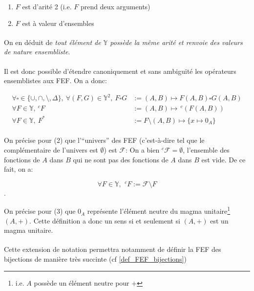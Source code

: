 \documentclass{article}
\newcommand{\Y}{{\mathbb Y}}
\newcommand{\cF}{{\mathcal F}}
\begin{document}
\begin{enumerate}
	\item $F$ est d'arité 2 (i.e. $F$ prend deux arguments)
	\item $F$ est à valeur d'ensembles
\end{enumerate}

\paragraph{}
On en déduit de \emph{tout élément de $\Y$ possède la même arité et renvoie des valeurs de nature ensembliste}.

\paragraph{}
Il est donc possible d'étendre canoniquement et sans ambiguïté les opérateurs ensemblistes aux FEF.
On a donc:

\begin{align}
	\forall \square \in \{\cup, \cap, \setminus, \Delta \},\ \forall (F, G) \in \Y^2,\ F \square G &:= (A, B)\mapsto F(A, B) \square G(A, B) \\
	\forall F\in \Y,\ ^c\!F &:= (A, B)\mapsto \,^c\!(F(A,B)) \\
	\forall F \in \Y,\ F^\ast &:= F \setminus (A, B)\mapsto \{x\mapsto 0_A\} 
\end{align}

\paragraph{}
On précise pour (2) que l'“univers” des FEF (c'est-à-dire tel que le complémentaire de l'univers est $\emptyset$) est $\cF$: On a bien $^c\!\cF = \emptyset$, l'ensemble des fonctions de $A$ dans $B$ qui ne sont pas des fonctions de $A$ dans $B$ est vide. De ce fait, on a:

\[
	\forall F\in \Y,\ \,^c\!F := \cF \setminus F
\]. 

On précise pour (3) que $0_A$ représente l'élément neutre du magma unitaire\footnote{i.e. $A$ possède un élément neutre pour $+$} $(A, +)$. Cette définition a donc un sens si et seulement si $(A, +)$ est un magma unitaire.

\paragraph{}
Cette extension de notation permettra notamment de définir la FEF des bijections de manière très succinte (cf \ref{def_FEF_bijections})
\end{document}
